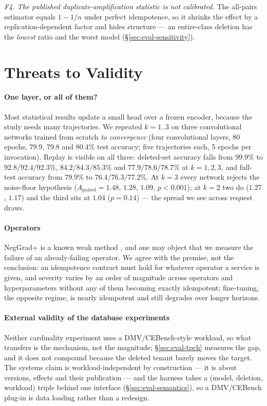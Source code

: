 \documentclass[conference]{IEEEtran}
\newcommand{\Apa}{A_{\mathrm{paired}}}
\begin{document}
\emph{F4. The published duplicate-amplification statistic is not calibrated.}  The all-pairs
estimator equals $1-1/n$ under perfect idempotence, so it shrinks the effect by a
replication-dependent factor and hides structure --- an entire-class deletion has the
\emph{lowest} ratio and the worst model (\S\ref{sec:eval-sensitivity}).

\section{Threats to Validity}
\label{sec:limits}

\paragraph{One layer, or all of them?}
Most statistical results update a small head over a frozen encoder, because the study
needs many trajectories.  We repeated $k=1..3$ on three convolutional networks trained
from scratch \emph{to convergence} (four convolutional layers, 80 epochs, $79.9$, $79.8$
and $80.4\%$ test accuracy; five trajectories each, 5 epochs per invocation).  Replay is
visible on all three: deleted-set accuracy falls from $99.9\%$ to
$92.8/92.4/92.3\%$, $84.2/84.3/85.3\%$ and $77.9/78.6/78.7\%$ at $k=1,2,3$, and
full-test accuracy from $79.9\%$ to $76.4/76.3/77.2\%$.  At $k=3$ every network rejects
the noise-floor hypothesis ($\Apa=1.48$, $1.28$, $1.09$, $p<0.001$); at $k=2$ two do
($1.27$, $1.17$) and the third sits at $1.04$ ($p=0.14$) --- the spread we see across
request draws.

\paragraph{Operators}
NegGrad+ is a known weak method \cite{hayes2025inexact}, and one may object
that we measure the failure of an already-failing operator.  We agree with the
premise, not the conclusion: an idempotence contract must hold for whatever operator a
service is given, and severity varies by an order of magnitude across operators and
hyperparameters without any of them becoming exactly idempotent; fine-tuning, the
opposite regime, is nearly idempotent and still degrades over longer horizons.

\paragraph{External validity of the database experiments}
Neither cardinality experiment uses a DMV/CEBench-style workload, so what transfers is the
mechanism, not the magnitude; \S\ref{sec:eval-tpch} measures the gap, and it does not compound
because the deleted tenant barely moves the target.  The systems claim is workload-independent by
construction --- it is about versions, effects and their publication --- and the harness takes a
(model, deletion, workload) triple behind one interface (\S\ref{sec:eval-semantics}), so a
DMV/CEBench plug-in is data loading rather than a redesign.
\end{document}
